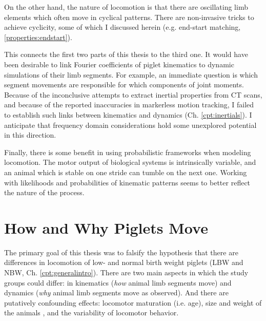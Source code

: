 \begin{change}
On the other hand, the nature of locomotion is that there are oscillating limb elements which often move in cyclical patterns.
There are non-invasive tricks to achieve cyclicity, some of which I discussed herein (e.g. end-start matching, \ref{properties:endstart}).


This connects the first two parts of this thesis to the third one.
It would have been desirable to link Fourier coefficients of piglet kinematics to dynamic simulations of their limb segments.
For example, an immediate question is which segment movements are responsible for which components of joint moments.
Because of the inconclusive attempts to extract inertial properties from CT scans, and because of the reported inaccuracies in markerless motion tracking, I failed to establish such links between kinematics and dynamics (Ch. \ref{cpt:inertials}).
I anticipate that frequency domain considerations hold some unexplored potential in this direction.


Finally, there is some benefit in using probabilistic frameworks when modeling locomotion.
The motor output of biological systems is intrinsically variable, and an animal which is stable on one stride can tumble on the next one.
Working with likelihoods and probabilities of kinematic patterns seems to better reflect the nature of the process.
\end{change}
\section{How and Why Piglets Move}
\label{sec:orgf94ae68}
The primary goal of this thesis was to falsify the hypothesis that there are differences in locomotion of low- and normal birth weight piglets (LBW and NBW, Ch. \ref{cpt:generalintro}).
There are two main aspects in which the study groups could differ: in kinematics (\emph{how} animal limb segments move) and dynamics (\emph{why} animal limb segments move as observed).
And there are putatively confounding effects: locomotor maturation (i.e. age), size and weight of the animals \citep[i.e. physical appearance, cf.][]{Aerts2023}, and the variability of locomotor behavior.


